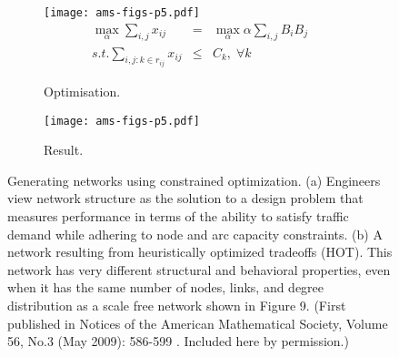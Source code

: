 \begin{figure}[thbp] 
  \begin{center}
    \begin{subfigure}[b]{0.44\textwidth} \centering
      \texttt{[image: ams-figs-p5.pdf]}\\
      \[ \begin{array}{rcl}
            \displaystyle \max_{\alpha} \sum_{i,j} x_{ij} & = & \displaystyle \max_\alpha \alpha \sum_{i,j} B_i B_j \\
            \displaystyle s.t. \sum_{i,j: k\in r_{ij}} x_{ij} & \leq & C_k, \;\forall k 
        \end{array}
      \]
      \caption{Optimisation.}
    \end{subfigure}
    \begin{subfigure}[b]{0.52\textwidth} \centering
      \texttt{[image: ams-figs-p5.pdf]}
      \caption{Result.}
     \end{subfigure}
    \caption{Generating networks using constrained optimization. (a) Engineers 
	 view network structure as the solution to a design problem that measures performance 
	 in terms of the ability to satisfy traffic demand while adhering to node and arc 
	 capacity constraints. (b) A network resulting from heuristically optimized tradeoffs 
	 (HOT). This network has very different structural and behavioral properties, even when 
	 it has the same number of nodes, links, and degree distribution as a scale free 
	 network shown in Figure 9.
	 (First published in Notices of the American Mathematical Society, Volume 56, 
	 No.3 (May 2009): 586-599
         \cite{willinger09:_mathem_and_inter}. Included here by
         permission.)
         \vspace{-4mm}
      \label{fig:hot_5}}
  \end{center}
\end{figure}         


